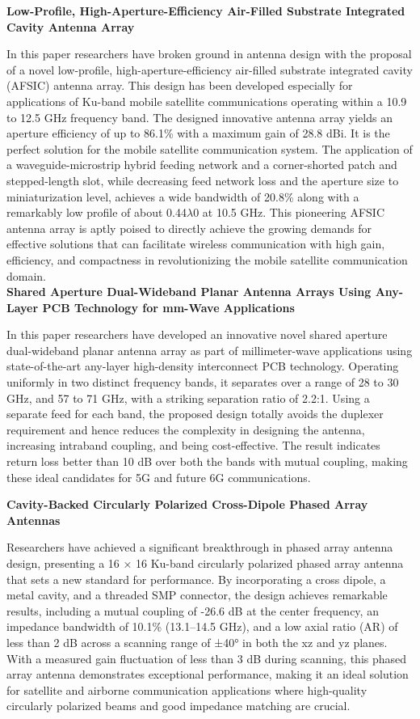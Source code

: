 \documentclass[12pt]{article}
\begin{document}
\noindent \textbf{Low-Profile, High-Aperture-Efficiency Air-Filled Substrate Integrated Cavity Antenna Array}
\par In this paper researchers have broken ground in antenna design with the proposal of a novel low-profile, high-aperture-efficiency air-filled substrate integrated cavity (AFSIC) antenna array. This design has been developed especially for applications of Ku-band mobile satellite communications operating within a 10.9 to 12.5 GHz frequency band. The designed innovative antenna array yields an aperture efficiency of up to 86.1\% with a maximum gain of 28.8 dBi. It is the perfect solution for the mobile satellite communication system. The application of a waveguide-microstrip hybrid feeding network and a corner-shorted patch and stepped-length slot, while decreasing feed network loss and the aperture size to miniaturization level, achieves a wide bandwidth of 20.8\% along with a remarkably low profile of about 0.44$\lambda 0$ at 10.5 GHz. This pioneering AFSIC antenna array is aptly poised to directly achieve the growing demands for effective solutions that can facilitate wireless communication with high gain, efficiency, and compactness in revolutionizing the mobile satellite communication domain.\\

\noindent \textbf{Shared Aperture Dual-Wideband Planar Antenna Arrays Using Any-Layer PCB Technology for mm-Wave Applications}
\par In this paper researchers have developed an innovative novel shared aperture dual-wideband planar antenna array as part of millimeter-wave applications using state-of-the-art any-layer high-density interconnect PCB technology. Operating uniformly in two distinct frequency bands, it separates over a range of 28 to 30 GHz, and 57 to 71 GHz, with a striking separation ratio of 2.2:1. Using a separate feed for each band, the proposed design totally avoids the duplexer requirement and hence reduces the complexity in designing the antenna, increasing intraband coupling, and being cost-effective. The result indicates return loss better than 10 dB over both the bands with mutual coupling, making these ideal candidates for 5G and future 6G communications.

\noindent \textbf{Cavity-Backed Circularly Polarized Cross-Dipole Phased Array Antennas}
\par Researchers have achieved a significant breakthrough in phased array antenna design, presenting a 16 × 16 Ku-band circularly polarized phased array antenna that sets a new standard for performance. By incorporating a cross dipole, a metal cavity, and a threaded SMP connector, the design achieves remarkable results, including a mutual coupling of -26.6 dB at the center frequency, an impedance bandwidth of 10.1\% (13.1–14.5 GHz), and a low axial ratio (AR) of less than 2 dB across a scanning range of ±40° in both the xz and yz planes. With a measured gain fluctuation of less than 3 dB during scanning, this phased array antenna demonstrates exceptional performance, making it an ideal solution for satellite and airborne communication applications where high-quality circularly polarized beams and good impedance matching are crucial.\\
\end{document}

